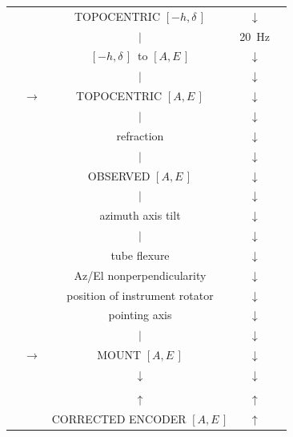 \documentclass[twoside,11pt]{starlink}
\providecommand{\mhadec}{$[-h,\delta\,]$}
\providecommand{\azel}{$[A,E\,]$}
\begin{document}
\begin{terminalv}
\begin{figure}
\begin{small}
\begin{center}
\begin{tabular}{|ccccc|}
        &                 &      TOPOCENTRIC \mhadec       &  $\downarrow$  & \\
        &                 &             $|$                &      20~Hz     & \\
        &                 &      \mhadec\ to \azel         &  $\downarrow$  & \\
        &                 &             $|$                &  $\downarrow$  & \\
        & $\rightarrow$   &       TOPOCENTRIC \azel        &  $\downarrow$  & \\
        &                 &             $|$                &  $\downarrow$  & \\
        &                 &          refraction            &  $\downarrow$  & \\
        &                 &             $|$                &  $\downarrow$  & \\
        &                 &        OBSERVED \azel          &  $\downarrow$  & \\
        &                 &             $|$                &  $\downarrow$  & \\
        &                 &      azimuth axis tilt         &  $\downarrow$  & \\
        &                 &             $|$                &  $\downarrow$  & \\
        &                 &         tube flexure           &  $\downarrow$  & \\
        &                 &   Az/El nonperpendicularity    &  $\downarrow$  & \\
        &                 & position of instrument rotator &  $\downarrow$  & \\
        &                 &         pointing axis          &  $\downarrow$  & \\
        &                 &             $|$                &  $\downarrow$  & \\
        & $\rightarrow$   &          MOUNT \azel           &  $\downarrow$  & \\
        &                 &         $\downarrow$           &  $\downarrow$  & \\
        &                 &         \fbox{SERVO}           &                & \\
        &                 &          $\uparrow$            &   $\uparrow$   & \\
        &                 &    CORRECTED ENCODER \azel     &   $\uparrow$   & \\

\end{tabular}
\end{center}
\end{small}
\end{figure}
\end{terminalv}
\end{document}
